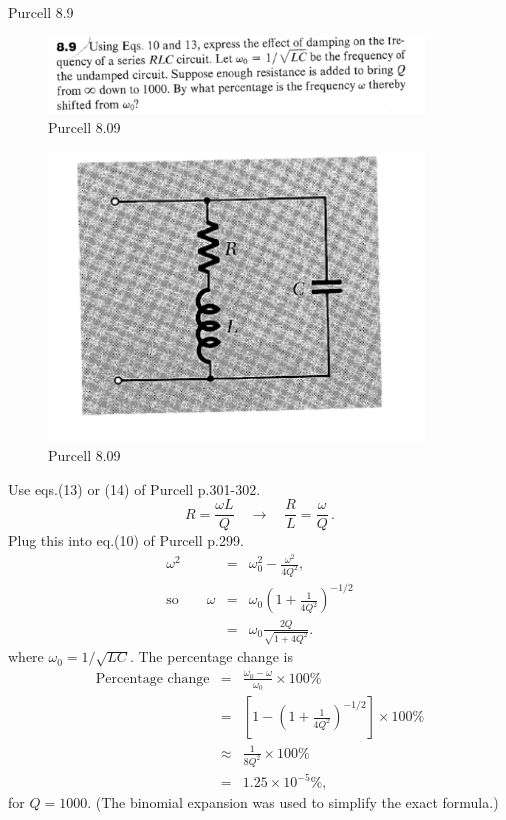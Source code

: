 \documentclass[makesolutionspdf]{esg8022pset}
\begin{document}
\begin{problem}{Purcell 8.9}
  \begin{figure}[H]
    \centering
    \includegraphics[width = 10cm]{pu809}
    \caption{Purcell 8.09}
  \end{figure}
  
  \begin{figure}[H]
    \centering
    \includegraphics[width = 10cm]{figpu809}
    \caption{Purcell 8.09}
  \end{figure}
\end{problem}

\begin{solution}
  Use eqs.(13) or (14) of Purcell p.301-302.
  \begin{equation}
  R=\frac{\omega L}{Q} \quad\to\quad \frac{R}{L}=\frac{\omega}{Q}\,.
  \end{equation}
  Plug this into eq.(10) of Purcell p.299.
  \begin{eqnarray}
  \omega^2 &=& \omega_0^2-\frac{\omega^2}{4Q^2},\\
  \textrm{so} \qquad \omega &=& \omega_0 \left(1+\frac{1}{4Q^2}\right)^{-1/2}\\
  &=& \omega_0\frac{2Q}{\sqrt{1+4Q^2}}.
  \end{eqnarray}
  where $\omega_0=1/\sqrt{LC}$.  The percentage change is
  \begin{eqnarray}
  \textrm{Percentage change} &=& \frac{\omega_0-\omega}{\omega_0}\times
  100\%\nonumber\\
  &=& \left[1-\left(1+\frac{1}{4Q^2}\right)^{-1/2}\right]\times 100\%\nonumber\\
  &\approx & \frac{1}{8Q^2}\times 100\%\nonumber\\
  &=& 1.25\times 10^{-5} \%,
  \end{eqnarray}
  for $Q=1000$.  (The binomial expansion was used to simplify the exact formula.)

\end{solution}
\end{document}

